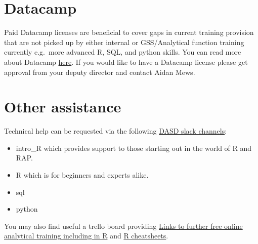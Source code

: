 \documentclass[
]{book}
\providecommand{\tightlist}{%
  \setlength{\itemsep}{0pt}\setlength{\parskip}{0pt}}
\begin{document}
\hypertarget{datacamp}{%
\section{Datacamp}\label{datacamp}}

Paid Datacamp licenses are beneficial to cover gaps in current training provision that are not picked up by either internal or GSS/Analytical function training currently e.g.~more advanced R, SQL, and python skills. You can read more about Datacamp \href{https://www.datacamp.com/}{here}. If you would like to have a Datacamp license please get approval from your deputy director and contact Aidan Mews.

\hypertarget{other-assistance}{%
\section{Other assistance}\label{other-assistance}}

Technical help can be requested via the following \href{https://asdslack.slack.com/}{DASD slack channels}:

\begin{itemize}
\tightlist
\item
  intro\_R which provides support to those starting out in the world of R and RAP.
\item
  R which is for beginners and experts alike.
\item
  sql
\item
  python
\end{itemize}

You may also find useful a trello board providing \href{https://trello.com/b/D5pSkqnT/online-analytical-training}{Links to further free online analytical training including in R} and \href{https://rstudio.com/resources/cheatsheets/}{R cheatsheets}.

  
\end{document}
